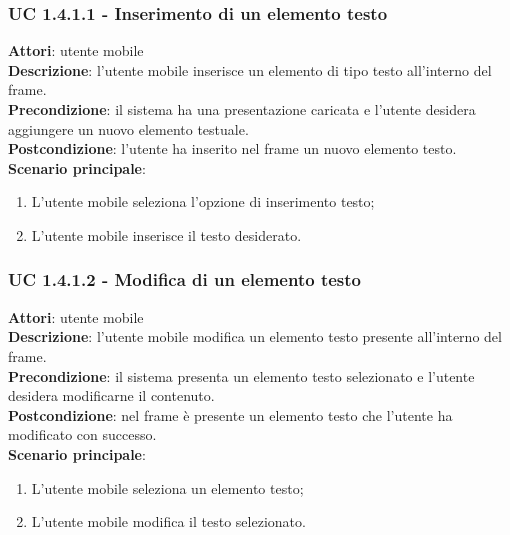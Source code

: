 \subsubsection{UC 1.4.1.1 - Inserimento di un elemento testo}{
	\label{uc1.4.1.1}
	\textbf{Attori}: utente mobile \\
	\textbf{Descrizione}: l'utente mobile inserisce un elemento di tipo testo all'interno del frame. \\
	\textbf{Precondizione}: il sistema ha una presentazione caricata e l'utente desidera aggiungere un nuovo elemento testuale.	\\
	\textbf{Postcondizione}: l'utente ha inserito nel frame un nuovo elemento testo.	\\
	\textbf{Scenario principale}:
	\begin{enumerate}
		\item L'utente mobile seleziona l'opzione di inserimento testo;
		\item L'utente mobile inserisce il testo desiderato.
	\end{enumerate}
	}
\subsubsection{UC 1.4.1.2 - Modifica di un elemento testo}{
	\label{uc1.4.1.2}
	\textbf{Attori}: utente mobile \\
	\textbf{Descrizione}: l'utente mobile modifica un elemento testo presente all'interno del frame. \\
	\textbf{Precondizione}: il sistema presenta un elemento testo selezionato e l'utente desidera modificarne il contenuto.	\\
	\textbf{Postcondizione}: nel frame è presente un elemento testo che l'utente ha modificato con successo.	\\
	\textbf{Scenario principale}:
	\begin{enumerate}
		\item L'utente mobile seleziona un elemento testo;
		\item L'utente mobile modifica il testo selezionato.
	\end{enumerate}
	}	
